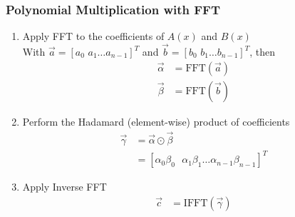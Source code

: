 \documentclass[
	11pt, %
]{beamer}
\begin{document}

\begin{frame}
    \frametitle{Polynomial Multiplication with FFT}
    \begin{enumerate}
        \item Apply FFT to the coefficients of $A(x)$ and $B(x)$ \\
        With $\vec{a} = [a_0\,\,a_1\dots a_{n-1}]^T$ and $\vec{b} = [b_0\,\,b_1\dots b_{n-1}]^T$, then
        \begin{align*}
            \vec{\alpha} &= \text{FFT}(\vec{a}) \tag*{$O(n\log n)$} \\
            \vec{\beta} &= \text{FFT}(\vec{b}) \tag*{$O(n\log n)$}
        \end{align*}
        \item Perform the Hadamard (element-wise) product of coefficients
        \begin{align*}
            \vec{\gamma} &= \vec{\alpha} \odot \vec{\beta} \\
                &= [\alpha_0\beta_0\,\,\,\,\alpha_1\beta_1\dots\alpha_{n-1}\beta_{n-1}]^T \tag*{$O(n)$}
        \end{align*}
        \item Apply Inverse FFT
        \begin{align*}
            \vec{c} &= \text{IFFT}(\vec{\gamma}) \tag*{$O(n\log n)$}
        \end{align*}
    \end{enumerate}
\end{frame}



\end{document}
